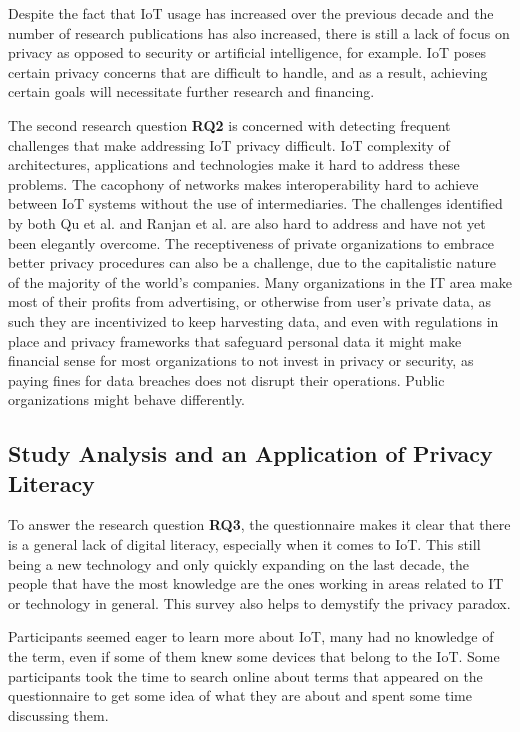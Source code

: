 Despite the fact that IoT usage has increased over the previous decade and
the number of research publications has also increased, there is still a lack
of focus on privacy as opposed to security or artificial intelligence, for
example. IoT poses certain privacy concerns that are difficult to handle, and
as a result, achieving certain goals will necessitate further research and
financing.

The second research question \textbf{RQ2} is concerned with detecting frequent
challenges that make addressing IoT privacy difficult. IoT complexity of architectures,
applications and technologies make it hard to address these problems. The
cacophony of networks makes interoperability hard to achieve between IoT systems
without the use of intermediaries. The challenges identified by both Qu et
al. \cite{Qu2018Privacy} and Ranjan et al. \cite{perera2015big} are also hard
to address and have not yet been elegantly overcome.
The receptiveness of private organizations to embrace better privacy procedures
can also be a challenge, due to the capitalistic nature of the majority of the
world's companies. Many organizations in the IT area make most of their profits
from advertising, or otherwise from user's private data, as such they are incentivized
to keep harvesting data, and even with regulations in place and privacy frameworks
that safeguard personal data it might make financial sense for most organizations
to not invest in privacy or security, as paying fines for data breaches does not
disrupt their operations. Public organizations might behave differently.

\subsection{Study Analysis and an Application of Privacy Literacy}

To answer the research question \textbf{RQ3}, the questionnaire makes it clear that there is
a general lack of digital literacy, especially when it comes to IoT.
This still being a new technology and only quickly expanding
on the last decade, the people that have the most knowledge are the
ones working in areas related to IT or technology in general.
This survey also helps to demystify the privacy paradox.

Participants seemed eager to learn more about IoT, many had no
knowledge of the term, even if some of them knew some devices
that belong to the IoT. Some participants took the time to search
online about terms that appeared on the questionnaire to get some
idea of what they are about and spent some time discussing them.

